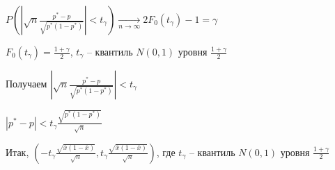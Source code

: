 $P\left(\left|\sqrt{n} \frac{p^* - p}{\sqrt{p^* (1 - p^*)}}\right| < t_\gamma\right) \underset{n \to \infty}{\longrightarrow} 2F_0(t_\gamma) - 1 = \gamma$

$F_0(t_\gamma) = \frac{1 + \gamma}{2}$, $t_\gamma$ -- квантиль $N(0, 1)$ уровня $\frac{1 + \gamma}{2}$

Получаем $\left|\sqrt{n} \frac{p^* - p}{\sqrt{p^* (1 - p^*)}}\right| < t_\gamma$

$|p^* - p| < t_\gamma \frac{\sqrt{p^* (1 - p^*)}}{\sqrt{n}}$

Итак, $\left(-t_\gamma \frac{\sqrt{\overline{x} (1 - \overline{x})}}{\sqrt{n}}, t_\gamma \frac{\sqrt{\overline{x} (1 - \overline{x})}}{\sqrt{n}}\right)$, где $t_\gamma$ -- квантиль $N(0, 1)$ уровня $\frac{1 + \gamma}{2}$



